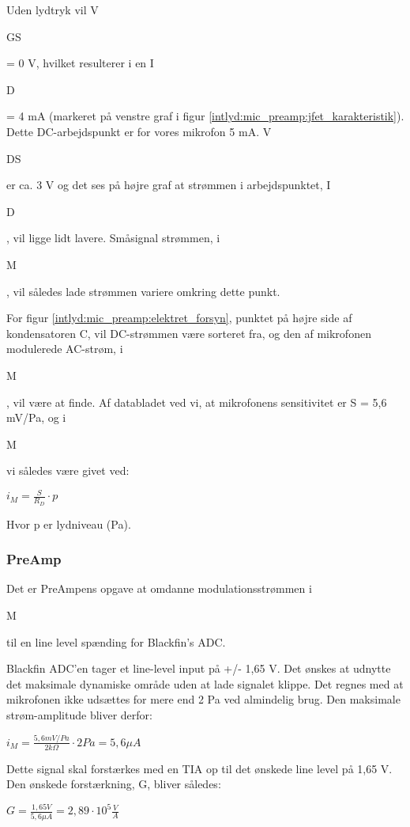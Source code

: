 Uden lydtryk vil V\begin{tiny}GS\end{tiny} = 0 V, hvilket resulterer i en I\begin{tiny}D\end{tiny}= 4 mA (markeret på venstre graf i figur \ref{intlyd:mic_preamp:jfet_karakteristik}). Dette DC-arbejdspunkt er for vores mikrofon 5 mA. V\begin{tiny}DS\end{tiny} er ca. 3 V og det ses på højre graf at strømmen i arbejdspunktet, I\begin{tiny}D\end{tiny}, vil ligge lidt lavere. Småsignal strømmen, i\begin{tiny}M\end{tiny}, vil således lade strømmen variere omkring dette punkt.

For figur \ref{intlyd:mic_preamp:elektret_forsyn}, punktet på højre side af kondensatoren C, vil DC-strømmen være sorteret fra, og den af mikrofonen modulerede AC-strøm, i\begin{tiny}M\end{tiny}, vil være at finde. Af databladet ved vi, at mikrofonens sensitivitet er S = 5,6 mV/Pa, og i\begin{tiny}M\end{tiny} vi således være givet ved: 
\begin{center}
${ i }_{ M }=\frac { S }{ { R }_{ D } } \cdot p$
\end{center}
Hvor p er lydniveau (Pa).

\subsubsection{PreAmp} 
Det er PreAmpens opgave at omdanne modulationsstrømmen i\begin{tiny}M\end{tiny} til en line level spænding for Blackfin's ADC. 

Blackfin ADC'en tager et line-level input på +/- 1,65 V. 
Det ønskes at udnytte det maksimale dynamiske område uden at lade signalet klippe. Det regnes med at mikrofonen ikke udsættes for mere end 2 Pa ved almindelig brug. Den maksimale strøm-amplitude bliver derfor: 
\begin{center}
${ i }_{ M }=\frac { 5,6mV/Pa }{ 2k\Omega  } \cdot 2Pa=5,6 \mu A$
\end{center}
Dette signal skal forstærkes med en TIA op til det ønskede line level på 1,65 V. Den ønskede forstærkning, G, bliver således:
\begin{center}
$G=\frac { 1,65V }{ 5,6\mu A } =2,89\cdot { 10 }^{ 5 }\frac { V }{ A } $
\end{center}

